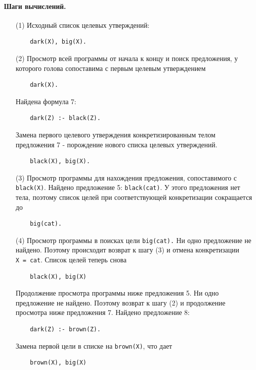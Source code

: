 \documentclass[12pt, openany, twoside]{book} %
\begin{document}
\paragraph{Шаги вычислений.}
\begin{itemize}
\item[(1)] Исходный список целевых утверждений:
{\tt\begin{verbatim}
    dark(X), big(X).
\end{verbatim}}

\item[(2)] Просмотр всей программы от начала к концу и поиск предложения, у которого голова сопоставима с первым целевым утверждением
{\tt\begin{verbatim}
    dark(X).
\end{verbatim}}

\noindent Найдена формула 7:

{\tt\begin{verbatim}
    dark(Z) :- black(Z).
\end{verbatim}}

\noindent Замена первого целевого утверждения конкретизированным телом предложения 7 - порождение нового списка целевых утверждений.

{\tt\begin{verbatim}
    black(X), big(X).
\end{verbatim}}

\item[(3)] Просмотр программы для нахождения предложения, сопоставимого с \texttt{black(X)}. Найдено предложение 5: \texttt{black(cat)}. У этого предложения нет тела, поэтому список целей при соответствующей конкретизации сокращается до
{\tt\begin{verbatim}
    big(cat).
\end{verbatim}}

\item[(4)] Просмотр программы в поисках цели \texttt{big(cat).} Ни одно предложение не найдено. Поэтому происходит возврат к шагу (3) и отмена конкретизации {\tt X~=~cat}.
Список целей теперь снова
{\tt\begin{verbatim}
    black(X), big(X)
\end{verbatim}}

\noindent Продолжение просмотра программы ниже предложения 5. Ни одно предложение не найдено. Поэтому возврат к шагу (2) и продолжение просмотра ниже предложения 7. Найдено предложение 8:
{\tt\begin{verbatim}
    dark(Z) :- brown(Z).
\end{verbatim}}
\noindent   Замена первой цели в списке на \texttt{brown(Х)}, что дает
{\tt\begin{verbatim}
    brown(X), big(X)
\end{verbatim}}


\end{itemize}
\end{document}
